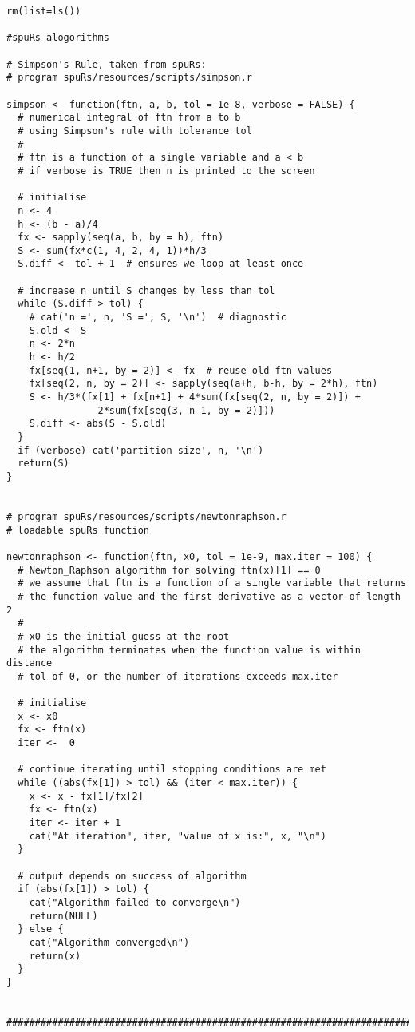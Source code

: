 \documentclass[a4paper, 11pt, oneside]{article}
\begin{document}
\begin{verbatim}
rm(list=ls())

#spuRs alogorithms

# Simpson's Rule, taken from spuRs:
# program spuRs/resources/scripts/simpson.r

simpson <- function(ftn, a, b, tol = 1e-8, verbose = FALSE) {
  # numerical integral of ftn from a to b
  # using Simpson's rule with tolerance tol
  #
  # ftn is a function of a single variable and a < b
  # if verbose is TRUE then n is printed to the screen
  
  # initialise
  n <- 4
  h <- (b - a)/4
  fx <- sapply(seq(a, b, by = h), ftn)
  S <- sum(fx*c(1, 4, 2, 4, 1))*h/3
  S.diff <- tol + 1  # ensures we loop at least once
  
  # increase n until S changes by less than tol
  while (S.diff > tol) {
    # cat('n =', n, 'S =', S, '\n')  # diagnostic
    S.old <- S
    n <- 2*n
    h <- h/2
    fx[seq(1, n+1, by = 2)] <- fx  # reuse old ftn values
    fx[seq(2, n, by = 2)] <- sapply(seq(a+h, b-h, by = 2*h), ftn)
    S <- h/3*(fx[1] + fx[n+1] + 4*sum(fx[seq(2, n, by = 2)]) +
                2*sum(fx[seq(3, n-1, by = 2)]))
    S.diff <- abs(S - S.old)
  }
  if (verbose) cat('partition size', n, '\n')
  return(S)
}


# program spuRs/resources/scripts/newtonraphson.r
# loadable spuRs function

newtonraphson <- function(ftn, x0, tol = 1e-9, max.iter = 100) {
  # Newton_Raphson algorithm for solving ftn(x)[1] == 0
  # we assume that ftn is a function of a single variable that returns
  # the function value and the first derivative as a vector of length 2
  #
  # x0 is the initial guess at the root
  # the algorithm terminates when the function value is within distance
  # tol of 0, or the number of iterations exceeds max.iter
  
  # initialise
  x <- x0
  fx <- ftn(x)
  iter <-  0
  
  # continue iterating until stopping conditions are met
  while ((abs(fx[1]) > tol) && (iter < max.iter)) {
    x <- x - fx[1]/fx[2]
    fx <- ftn(x)
    iter <- iter + 1
    cat("At iteration", iter, "value of x is:", x, "\n")
  }
  
  # output depends on success of algorithm
  if (abs(fx[1]) > tol) {
    cat("Algorithm failed to converge\n")
    return(NULL)
  } else {
    cat("Algorithm converged\n")
    return(x)
  }
}


######################################################################################################


\end{verbatim}
\end{document}
